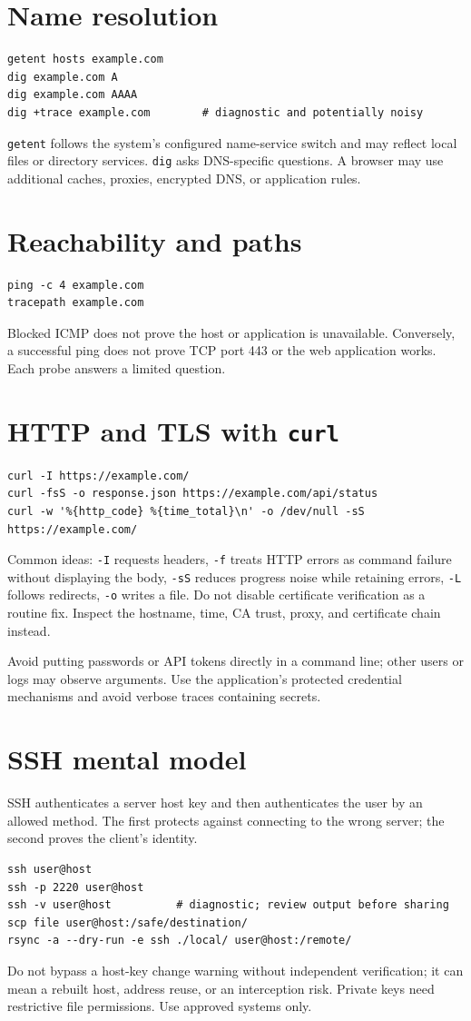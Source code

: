 \documentclass[11pt,oneside,openany]{book}
\begin{document}
\section{Name resolution}
\begin{lstlisting}
getent hosts example.com
dig example.com A
dig example.com AAAA
dig +trace example.com        # diagnostic and potentially noisy
\end{lstlisting}
\texttt{getent} follows the system's configured name-service switch and may reflect local files or directory services. \texttt{dig} asks DNS-specific questions. A browser may use additional caches, proxies, encrypted DNS, or application rules.

\section{Reachability and paths}
\begin{lstlisting}
ping -c 4 example.com
tracepath example.com
\end{lstlisting}
Blocked ICMP does not prove the host or application is unavailable. Conversely, a successful ping does not prove TCP port 443 or the web application works. Each probe answers a limited question.

\section{HTTP and TLS with \texttt{curl}}
\begin{lstlisting}
curl -I https://example.com/
curl -fsS -o response.json https://example.com/api/status
curl -w '%{http_code} %{time_total}\n' -o /dev/null -sS https://example.com/
\end{lstlisting}
Common ideas: \texttt{-I} requests headers, \texttt{-f} treats HTTP errors as command failure without displaying the body, \texttt{-sS} reduces progress noise while retaining errors, \texttt{-L} follows redirects, \texttt{-o} writes a file. Do not disable certificate verification as a routine fix. Inspect the hostname, time, CA trust, proxy, and certificate chain instead.

Avoid putting passwords or API tokens directly in a command line; other users or logs may observe arguments. Use the application's protected credential mechanisms and avoid verbose traces containing secrets.

\section{SSH mental model}
SSH authenticates a server host key and then authenticates the user by an allowed method. The first protects against connecting to the wrong server; the second proves the client's identity.
\begin{lstlisting}
ssh user@host
ssh -p 2220 user@host
ssh -v user@host          # diagnostic; review output before sharing
scp file user@host:/safe/destination/
rsync -a --dry-run -e ssh ./local/ user@host:/remote/
\end{lstlisting}
Do not bypass a host-key change warning without independent verification; it can mean a rebuilt host, address reuse, or an interception risk. Private keys need restrictive file permissions. Use approved systems only.
\end{document}
